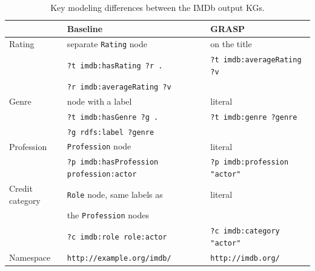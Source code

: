 \providecommand{\qc}[1]{{\footnotesize\texttt{#1}}}
\begin{table}[!htbp]
  \centering
  \small
  \renewcommand{\arraystretch}{1.15}
  \begin{tabular}{l l l}
    \hline
    & \textbf{Baseline} & \textbf{GRASP} \\
    \hline
    Rating          & separate \texttt{Rating} node      & on the title \\
                    & \qc{?t imdb:hasRating ?r .}        & \qc{?t imdb:averageRating ?v} \\
                    & \qc{?r imdb:averageRating ?v}           & \\ \addlinespace[4pt]
    \hline
    Genre           & node with a label                  & literal \\
                    & \qc{?t imdb:hasGenre ?g .}         & \qc{?t imdb:genre ?genre} \\
                    & \qc{?g rdfs:label ?genre}          & \\ \addlinespace[4pt]
    \hline
    Profession      & \texttt{Profession} node           & literal \\
                    & \qc{?p imdb:hasProfession profession:actor} & \qc{?p imdb:profession "actor"} \\ \addlinespace[4pt]
    \hline
    Credit category & \texttt{Role} node, same labels as & literal \\
                    & the \texttt{Profession} nodes      & \\
                    & \qc{?c imdb:role role:actor}       & \qc{?c imdb:category "actor"} \\ \addlinespace[4pt]
    \hline
    Namespace       & \qc{http://example.org/imdb/}      & \qc{http://imdb.org/} \\
    \hline
  \end{tabular}
  \caption{Key modeling differences between the IMDb output KGs.}
  \label{tab:imdb-diff}
\end{table}

